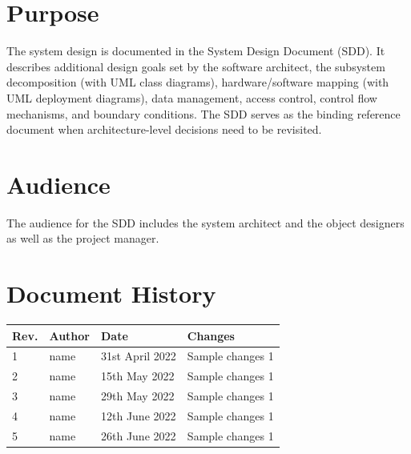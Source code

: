 \documentclass[a4paper,12pt]{scrartcl}
\begin{document}
    \section*{Purpose}
    The system design is documented in the System Design Document (SDD). It describes additional design goals set by the software architect, the subsystem decomposition (with UML class diagrams), hardware/software mapping (with UML deployment diagrams), data management, access control, control flow mechanisms, and boundary conditions. The SDD serves as the binding reference document when architecture-level decisions need to be revisited.

    \section*{Audience}
    The audience for the SDD includes the system architect and the object designers as well as the project manager.
    \nopagebreak

    \renewcommand{\contentsname}{Table of Contents}
    \tableofcontents
    \section*{Document History}

    \begin{tabular}{
        |p{}%
        |p{}%
        |p{}
        |p{}|%
    }
        \hline
        Rev. & Author & Date            & Changes          \\
        \hline
        1    & name   & 31st April 2022 & Sample changes 1 \\
        \hline
        2    & name   & 15th May 2022   & Sample changes 1 \\
        \hline
        3    & name   & 29th May 2022   & Sample changes 1 \\
        \hline
        4    & name   & 12th June 2022  & Sample changes 1 \\
        \hline
        5    & name   & 26th June 2022  & Sample changes 1 \\
        \hline
    \end{tabular}
    \newpage
    \sectionfont{\color[HTML]{355a8a}}  %
    \subsectionfont{\color[HTML]{4e81bc}}
\end{document}
